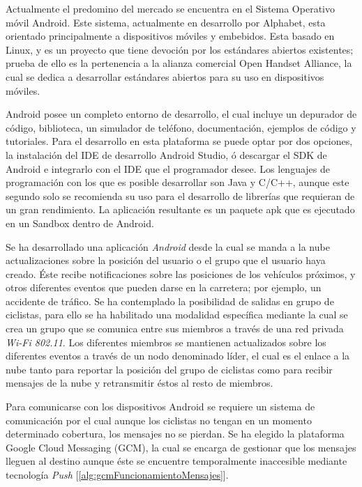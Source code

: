 Actualmente el predomino del mercado se encuentra en el Sistema Operativo móvil Android. Este sistema, actualmente en desarrollo por Alphabet, esta orientado principalmente a dispositivos móviles y embebidos. Esta basado en Linux, y es un proyecto que tiene devoción por los estándares abiertos existentes; prueba de ello es la pertenencia a la alianza comercial Open Handset Alliance, la cual se dedica a desarrollar estándares abiertos para su uso en dispositivos móviles. 

Android posee un completo entorno de desarrollo, el cual incluye un depurador de código, biblioteca, un simulador de teléfono, documentación, ejemplos de código y tutoriales. Para el desarrollo en esta plataforma se puede optar por dos opciones, la instalación del IDE de desarrollo Android Studio, ó descargar el SDK de Android e integrarlo con el IDE que el programador desee. Los lenguajes de programación con los que es posible desarrollar son Java y C/C++, aunque este segundo solo se recomienda su uso para el desarrollo de librerías que requieran de un gran rendimiento. La aplicación resultante es un paquete apk que es ejecutado en un Sandbox dentro de Android.

Se ha desarrollado una aplicación \emph{Android} desde la cual se manda a la nube actualizaciones sobre la posición del usuario o el grupo que el usuario haya creado. \'Este recibe notificaciones sobre las posiciones de los vehículos próximos, y otros diferentes eventos que pueden darse en la carretera; por ejemplo, un accidente de tráfico. Se ha contemplado la posibilidad de salidas en grupo de ciclistas, para ello se ha habilitado una modalidad específica mediante la cual se crea un grupo que se comunica entre sus miembros a través de una red privada \emph{Wi-Fi 802.11}. Los diferentes miembros se mantienen actualizados sobre los diferentes eventos a través de un nodo denominado líder, el cual es el enlace a la nube tanto para reportar la posición del grupo de ciclistas como para recibir mensajes de la nube y retransmitir éstos al resto de miembros.

Para comunicarse con los dispositivos Android se requiere un sistema de comunicación por el cual aunque los ciclistas no tengan en un momento determinado cobertura, los mensajes no se pierdan. Se ha elegido la plataforma Google Cloud Messaging (GCM), la cual se encarga de gestionar que los mensajes lleguen al destino aunque éste se encuentre temporalmente inaccesible mediante tecnología \emph{Push} [\ref{alg:gcmFuncionamientoMensajes}]. 


